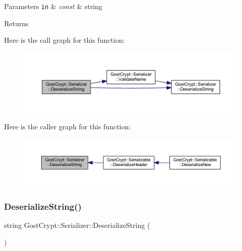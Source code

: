 \begin{DoxyParams}[1]{Parameters}
\mbox{\tt in}  & {\em const} & string \\
\hline
\end{DoxyParams}
\begin{DoxyReturn}{Returns}

\end{DoxyReturn}
Here is the call graph for this function\+:
\nopagebreak
\begin{figure}[H]
\begin{center}
\leavevmode
\includegraphics[width=350pt]{class_gost_crypt_1_1_serializer_afc4e689cfaf89809fd729c1ec2a8ec8a_cgraph}
\end{center}
\end{figure}
Here is the caller graph for this function\+:
\nopagebreak
\begin{figure}[H]
\begin{center}
\leavevmode
\includegraphics[width=350pt]{class_gost_crypt_1_1_serializer_afc4e689cfaf89809fd729c1ec2a8ec8a_icgraph}
\end{center}
\end{figure}
\mbox{\label{class_gost_crypt_1_1_serializer_ae242985e8f3361a362ef2068768727e2}} 
\subsubsection{\texorpdfstring{Deserialize\+String()}{DeserializeString()}\hspace{0.1cm}{\footnotesize\ttfamily [2/2]}}
{\footnotesize\ttfamily string Gost\+Crypt\+::\+Serializer\+::\+Deserialize\+String (\begin{DoxyParamCaption}{ }\end{DoxyParamCaption})\hspace{0.3cm}{\ttfamily [protected]}}

